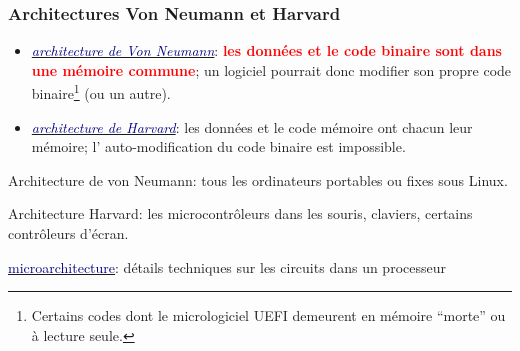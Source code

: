 \documentclass[lualatex,11pt,a4paper,svgnames,french]{beamer}
\newcommand{\clbrougras}[1]{{\textcolor{Red}{\textbf{#1}}}}
\begin{document}
\begin{frame}\frametitle{Architectures Von Neumann et Harvard}

  \begin{itemize}
    \item
      \href{https://fr.wikipedia.org/wiki/Architecture_de_von_Neumann}{\textcolor{Navy}{\textit{architecture
            de Von Neumann}}}: \clbrougras{les données et le code
        binaire sont dans une mémoire commune}; un logiciel pourrait
      donc modifier son propre code binaire\footnote{Certains codes
      dont le micrologiciel UEFI demeurent en mémoire ``morte'' ou à
      lecture seule.} (ou un autre).
    \item
      \href{https://fr.wikipedia.org/wiki/Architecture_de_type_Harvard}{\textcolor{Navy}{\textit{architecture
            de Harvard}}}: les données et le code mémoire ont chacun
        leur mémoire; l' auto-modification du code binaire est impossible.
  \end{itemize}

  \bigskip

  \begin{relsize}{-0.5}
  Architecture de von Neumann: tous les ordinateurs portables ou fixes sous Linux.

  \medskip
  
  Architecture Harvard: les microcontrôleurs dans les souris,
  claviers, certains contrôleurs d'écran.
  \end{relsize}
  
  \medskip

  \href{https://fr.wikipedia.org/wiki/Microarchitecture}{\textcolor{Navy}{microarchitecture}}: détails techniques sur les circuits dans un processeur
\end{frame}
\end{document}
